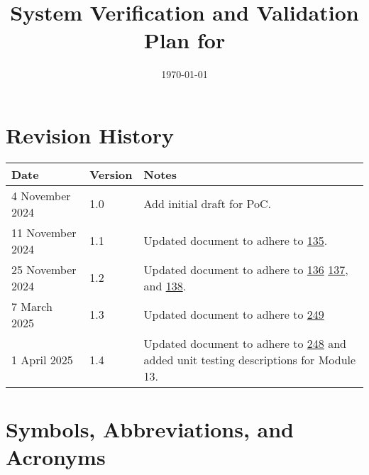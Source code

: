 \documentclass[12pt, titlepage]{article}
\begin{document}
\title{System Verification and Validation Plan for \progname{}} 
\author{\authname}
\date{\today}
	
\maketitle


\section*{Revision History}

\begin{tabularx}{\textwidth}{p{4cm}p{1.5cm}X} \toprule {\bf Date} & {\bf
Version} & {\bf Notes}\\
\midrule
4 November 2024 & 1.0 & Add initial draft for PoC.\\
11 November 2024 & 1.1 & Updated document to adhere to
\href{https://github.com/SumanyaG/Alkalytics/issues/135}{135}. \\
25 November 2024 & 1.2 & Updated document to adhere to
\href{https://github.com/SumanyaG/Alkalytics/issues/136}{136}
\href{https://github.com/SumanyaG/Alkalytics/issues/137}{137}, and
\href{https://github.com/SumanyaG/Alkalytics/issues/138}{138}. \\
7 March 2025 & 1.3 & Updated document to adhere to
\href{https://github.com/SumanyaG/Alkalytics/issues/249}{249} \\
1 April 2025 & 1.4 & Updated document to adhere to
\href{https://github.com/SumanyaG/Alkalytics/issues/248}{248} and added unit
testing descriptions for Module 13. \\
\bottomrule
\end{tabularx}

\newpage

\tableofcontents

\listoftables

\newpage

\section{Symbols, Abbreviations, and Acronyms}
\end{document}
